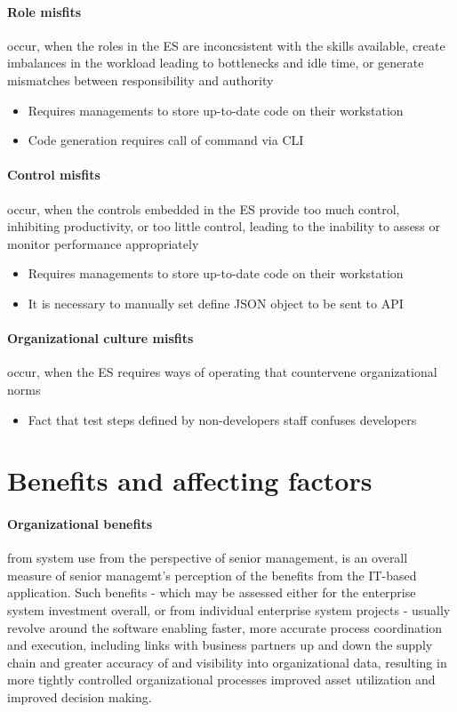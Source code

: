 \paragraph{Role misfits} occur, when the roles in the ES are inconcsistent with the skills available, create imbalances in the workload leading to bottlenecks and idle time, or generate mismatches between responsibility and authority 
\begin{itemize}
	\item Requires managements to store up-to-date code on their workstation
	\item Code generation requires call of command via CLI
\end{itemize}

\paragraph{Control misfits} occur, when the controls embedded in the ES provide too much control, inhibiting productivity, or too little control, leading to the inability to assess or monitor performance appropriately 
\begin{itemize}
		\item Requires managements to store up-to-date code on their workstation
		\item It is necessary to manually set define JSON object to be sent to API
\end{itemize}


\paragraph{Organizational culture misfits}  occur, when the ES requires ways of operating that countervene organizational norms 
\begin{itemize}
	\item Fact that test steps defined by non-developers staff confuses developers
\end{itemize}


\section{Benefits and affecting factors}
\paragraph{Organizational benefits} from system use from the perspective of senior management, is an overall measure of senior managemt's perception of the benefits from the IT-based application. Such benefits - which may be assessed either for the enterprise system investment overall, or from individual enterprise system projects - usually revolve around the software enabling faster, more accurate process coordination and execution, including links with business partners up and down the supply chain and greater accuracy of and visibility into organizational data, resulting in more tightly controlled organizational processes improved asset utilization and improved decision making.


